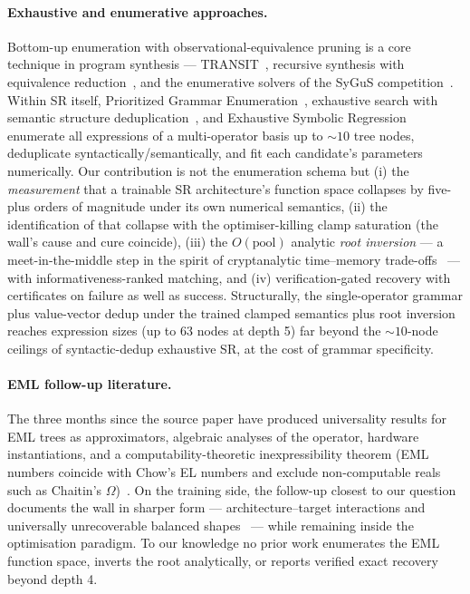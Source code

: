 \documentclass[11pt]{article}
\begin{document}
\paragraph{Exhaustive and enumerative approaches.} Bottom-up
enumeration with observational-equivalence pruning is a core
technique in program synthesis — TRANSIT~\cite{udupa2013}, recursive
synthesis with equivalence reduction~\cite{albarghouthi2013}, and
the enumerative solvers of the SyGuS competition~\cite{alur2013}.
Within SR itself, Prioritized Grammar Enumeration~\cite{worm2013},
exhaustive search with semantic structure
deduplication~\cite{kammerer2021}, and Exhaustive Symbolic
Regression~\cite{bartlett2023esr} enumerate all expressions of a
multi-operator basis up to ${\sim}10$ tree nodes, deduplicate
syntactically/semantically, and fit each candidate's parameters
numerically. Our contribution is not the enumeration schema but (i) the \emph{measurement} that a
trainable SR architecture's function space collapses by five-plus
orders of magnitude under its own numerical semantics, (ii) the
identification of that collapse with the optimiser-killing clamp
saturation (the wall's cause and cure coincide), (iii) the
$O(\text{pool})$ analytic \emph{root inversion} — a meet-in-the-middle
step in the spirit of cryptanalytic time--memory
trade-offs~\cite{diffie1977} — with informativeness-ranked matching,
and (iv) verification-gated recovery with certificates on failure as
well as success. Structurally, the single-operator grammar plus
value-vector dedup under the trained clamped semantics plus root
inversion reaches expression sizes (up to 63 nodes at depth 5) far
beyond the ${\sim}10$-node ceilings of syntactic-dedup exhaustive
SR, at the cost of grammar specificity.

\paragraph{EML follow-up literature.} The three months since the
source paper have produced universality results for EML trees as
approximators, algebraic analyses of the operator, hardware
instantiations, and a computability-theoretic inexpressibility
theorem (EML numbers coincide with Chow's EL numbers and exclude
non-computable reals such as Chaitin's
$\Omega$)~\cite{carney2026}. On the training side, the follow-up
closest to our question documents the wall in sharper form —
architecture--target interactions and universally unrecoverable
balanced shapes~\cite{gupta2026arch} — while remaining inside the
optimisation paradigm. To our knowledge no prior work enumerates the
EML function space, inverts the root analytically, or reports
verified exact recovery beyond depth 4.
\end{document}
